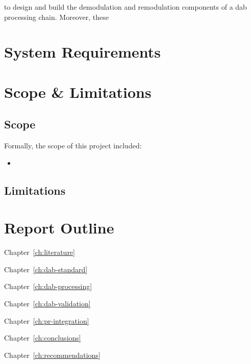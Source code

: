 \documentclass[class=report,11pt,crop=false]{standalone}
\begin{document}
to design and build the demodulation and remodulation components of a \gls{dab} processing chain. Moreover, these 

\section{System Requirements}

\section{Scope \& Limitations}

\subsection{Scope}
Formally, the scope of this project included:
\begin{itemize}
    \item 
\end{itemize}

\subsection{Limitations}


\section{Report Outline}
Chapter~\ref{ch:literature}

Chapter~\ref{ch:dab-standard}

Chapter~\ref{ch:dab-processing}

Chapter~\ref{ch:dab-validation}

Chapter~\ref{ch:pr-integration}

Chapter~\ref{ch:conclusions}

Chapter~\ref{ch:recommendations}



\ifstandalone

\printnoidxglossary[type=\acronymtype,nonumberlist]
\fi
\end{document}
